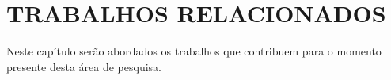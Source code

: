 \chapter{TRABALHOS RELACIONADOS}

Neste capítulo serão abordados os trabalhos que contribuem para o momento presente desta área de pesquisa.



